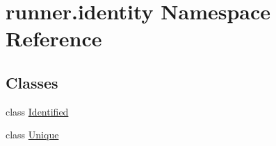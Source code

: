 \hypertarget{namespacerunner_1_1identity}{}\section{runner.\+identity Namespace Reference}
\label{namespacerunner_1_1identity}
\subsection*{Classes}
\begin{DoxyCompactItemize}
\item 
class \hyperlink{classrunner_1_1identity_1_1Identified}{Identified}
\item 
class \hyperlink{classrunner_1_1identity_1_1Unique}{Unique}
\end{DoxyCompactItemize}
